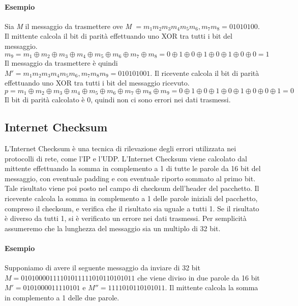\documentclass[12pt]{report}
\begin{document}
	\paragraph{Esempio}
	Sia \textit{M} il messaggio da trasmettere ove \textit{M} $= m_1m_2m_3m_4m_5m_6,m_7m_8 =  01010100$. Il mittente calcola il bit di parità effettuando uno XOR tra tutti i bit del messaggio.
	\begin{equation*}
			m_9 = m_1 \oplus m_2 \oplus m_3 \oplus m_4 \oplus m_5 \oplus m_6 \oplus m_7 \oplus m_8 = 0 \oplus 1 \oplus 0 \oplus 1 \oplus 0 \oplus 1 \oplus 0 \oplus 0  = 1
	\end{equation*}
	Il messaggio da trasmettere è quindi $M' = m_1m_2m_3m_4m_5m_6,m_7m_8m_9 = 010101001$.
	\vspace{\baselineskip}
	Il ricevente calcola il bit di parità effettuando uno XOR tra tutti i bit del messaggio ricevuto.
	\begin{equation*}
		p = m_1 \oplus m_2 \oplus m_3 \oplus m_4 \oplus m_5 \oplus m_6 \oplus m_7 \oplus m_8 \oplus m_9 = 0 \oplus 1 \oplus 0 \oplus 1 \oplus 0 \oplus 1 \oplus 0 \oplus 0 \oplus 1 = 0
	\end{equation*}
	Il bit di parità calcolato è 0, quindi non ci sono errori nei dati trasmessi.

	\subsection{Internet Checksum}
	L'Internet Checksum è una tecnica di rilevazione degli errori utilizzata nei protocolli di rete, come l'IP e l'UDP. L'Internet Checksum viene calcolato dal mittente effettuando la somma in complemento a 1 di tutte le parole da 16 bit del messaggio, con eventuale padding e con eventuale riporto sommato al primo bit. Tale risultato viene poi posto nel campo di checksum dell'header del pacchetto. Il ricevente calcola la somma in complemento a 1 delle parole iniziali del pacchetto, compreso il checksum, e verifica che il risultato sia uguale a tutti 1. Se il risultato è diverso da tutti 1, si è verificato un errore nei dati trasmessi. Per semplicità assumeremo che la lunghezza del messaggio sia un multiplo di 32 bit.

	\paragraph{Esempio}
	Supponiamo di avere il seguente messaggio da inviare di 32 bit $M = 0101 0000 1111 0101 1111 0101 1010 1011$ che viene diviso in due parole da 16 bit $M' = 0101 0000 1111 0101$ e $M'' = 1111 0101 1010 1011$. Il mittente calcola la somma in complemento a 1 delle due parole.
	
\end{document}
